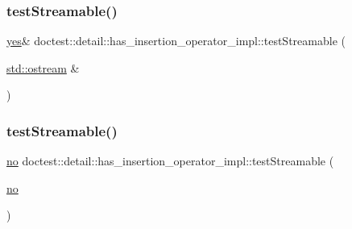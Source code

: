 \subsubsection{\texorpdfstring{test\+Streamable()}{testStreamable()}\hspace{0.1cm}{\footnotesize\ttfamily [1/2]}}
{\footnotesize\ttfamily \hyperlink{namespacedoctest_1_1detail_1_1has__insertion__operator__impl_a0351593f27f12bf077fd702f6fc26fb5}{yes}\& doctest\+::detail\+::has\+\_\+insertion\+\_\+operator\+\_\+impl\+::test\+Streamable (\begin{DoxyParamCaption}\item[{\hyperlink{doctest_8h_a116af65cb5e924b33ad9d9ecd7a783f3}{std\+::ostream} \&}]{ }\end{DoxyParamCaption})}

\mbox{\label{namespacedoctest_1_1detail_1_1has__insertion__operator__impl_a14a51200f83133bfb49ad3cfe34505ae}} 
\subsubsection{\texorpdfstring{test\+Streamable()}{testStreamable()}\hspace{0.1cm}{\footnotesize\ttfamily [2/2]}}
{\footnotesize\ttfamily \hyperlink{namespacedoctest_1_1detail_1_1has__insertion__operator__impl_a2abd7cf8c326904d6f21a4ef7bddb8e1}{no} doctest\+::detail\+::has\+\_\+insertion\+\_\+operator\+\_\+impl\+::test\+Streamable (\begin{DoxyParamCaption}\item[{\hyperlink{namespacedoctest_1_1detail_1_1has__insertion__operator__impl_a2abd7cf8c326904d6f21a4ef7bddb8e1}{no}}]{ }\end{DoxyParamCaption})}

